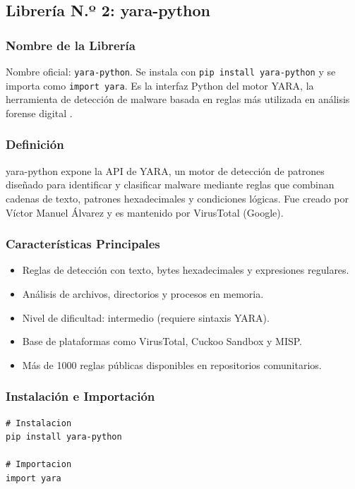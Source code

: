 \documentclass[12pt,a4paper]{article}
\begin{document}
\subsection{Librería N.º 2: yara-python}

\subsubsection{Nombre de la Librería}

Nombre oficial: \texttt{yara-python}. Se instala con
\texttt{pip install yara-python} y se importa como \texttt{import yara}.
Es la interfaz Python del motor YARA, la herramienta de detección de
malware basada en reglas más utilizada en análisis forense digital
\cite{virustotal2024}.

\subsubsection{Definición}

yara-python expone la API de YARA, un motor de detección de patrones
diseñado para identificar y clasificar malware mediante reglas que
combinan cadenas de texto, patrones hexadecimales y condiciones lógicas.
Fue creado por Víctor Manuel Álvarez \cite{alvarez2014} y es mantenido por
VirusTotal (Google).

\subsubsection{Características Principales}

\begin{itemize}
\item Reglas de detección con texto, bytes hexadecimales y expresiones regulares.
\item Análisis de archivos, directorios y procesos en memoria.
\item Nivel de dificultad: intermedio (requiere sintaxis YARA).
\item Base de plataformas como VirusTotal, Cuckoo Sandbox y MISP.
\item Más de 1000 reglas públicas disponibles en repositorios comunitarios.
\end{itemize}

\subsubsection{Instalación e Importación}

\begin{lstlisting}[caption={Instalación e importación de yara-python},
                   label=lst:yara_install]
# Instalacion
pip install yara-python

# Importacion
import yara
\end{lstlisting}
\end{document}
